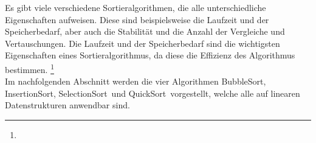 \documentclass[./entry.tex]{subfiles}
\begin{document}
    Es gibt viele verschiedene Sortieralgorithmen, die alle unterschiedliche Eigenschaften aufweisen.
    Diese sind beispielsweise die Laufzeit und der Speicherbedarf, aber auch die Stabilität
    und die Anzahl der Vergleiche und Vertauschungen.
    Die Laufzeit und der Speicherbedarf sind die wichtigsten Eigenschaften eines Sortieralgorithmus,
    da diese die Effizienz des Algorithmus bestimmen.
    \footnote{}\\

    Im nachfolgenden Abschnitt werden die vier Algorithmen \dq BubbleSort\dq, \dq InsertionSort\dq, \dq SelectionSort\dq\ und \dq QuickSort\dq\ vorgestellt,
    welche alle auf linearen Datenstrukturen anwendbar sind.
\end{document}
